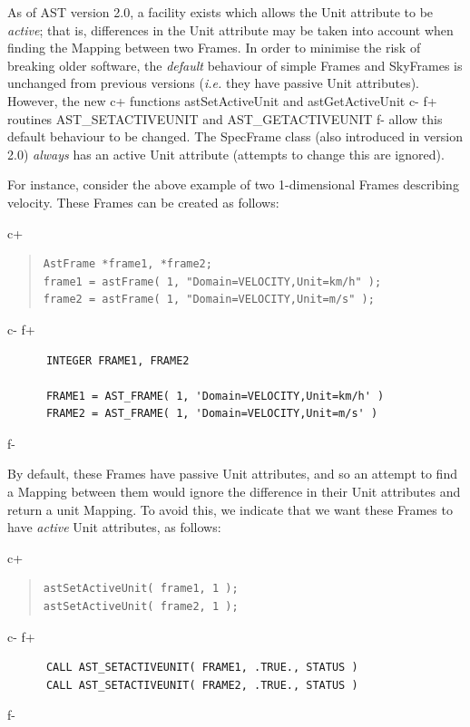 \documentclass[twoside,11pt]{article}
\begin{document}
As of AST version 2.0, a facility exists which allows the Unit attribute
to be \emph{active}; that is, differences in the 
Unit attribute may be taken into account when finding the Mapping between
two Frames. In order to minimise the risk of breaking older software, the 
\emph{default} behaviour of simple Frames and SkyFrames is unchanged from 
previous versions (\emph{i.e.} they have passive Unit attributes). However, 
the new 
c+
functions astSetActiveUnit and astGetActiveUnit
c-
f+
routines AST\_SETACTIVEUNIT and AST\_GETACTIVEUNIT
f-
allow this default behaviour to be changed. The SpecFrame class (also
introduced in version 2.0) \emph{always} has an active Unit attribute
(attempts to change this are ignored).

For instance, consider the above example of two 1-dimensional Frames
describing velocity. These Frames can be created as follows:

c+
\begin{quote}
\small
\begin{verbatim}
AstFrame *frame1, *frame2;
frame1 = astFrame( 1, "Domain=VELOCITY,Unit=km/h" );
frame2 = astFrame( 1, "Domain=VELOCITY,Unit=m/s" );
\end{verbatim}
\normalsize
\end{quote}
c-
f+
\small
\begin{verbatim}
      INTEGER FRAME1, FRAME2

      FRAME1 = AST_FRAME( 1, 'Domain=VELOCITY,Unit=km/h' )
      FRAME2 = AST_FRAME( 1, 'Domain=VELOCITY,Unit=m/s' )

\end{verbatim}
\normalsize
f-

By default, these Frames have passive Unit attributes, and so an attempt
to find a Mapping between them would ignore the difference in their Unit
attributes and return a unit Mapping. To avoid this, we indicate that we
want these Frames to have \emph{active} Unit attributes, as follows:

c+
\begin{quote}
\small
\begin{verbatim}
astSetActiveUnit( frame1, 1 );
astSetActiveUnit( frame2, 1 );
\end{verbatim}
\normalsize
\end{quote}
c-
f+
\small
\begin{verbatim}
      CALL AST_SETACTIVEUNIT( FRAME1, .TRUE., STATUS )
      CALL AST_SETACTIVEUNIT( FRAME2, .TRUE., STATUS )
\end{verbatim}
\normalsize
f-
\end{document}
